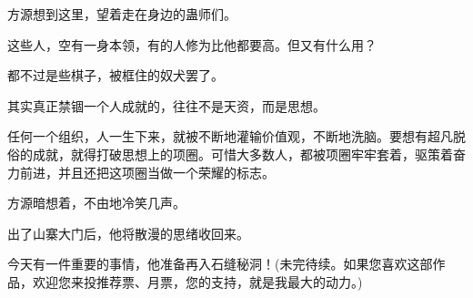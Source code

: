 \begin{this_body}
方源想到这里，望着走在身边的蛊师们。

这些人，空有一身本领，有的人修为比他都要高。但又有什么用？

都不过是些棋子，被框住的奴犬罢了。

其实真正禁锢一个人成就的，往往不是天资，而是思想。

任何一个组织，人一生下来，就被不断地灌输价值观，不断地洗脑。要想有超凡脱俗的成就，就得打破思想上的项圈。可惜大多数人，都被项圈牢牢套着，驱策着奋力前进，并且还把这项圈当做一个荣耀的标志。

方源暗想着，不由地冷笑几声。

出了山寨大门后，他将散漫的思绪收回来。

今天有一件重要的事情，他准备再入石缝秘洞！(未完待续。如果您喜欢这部作品，欢迎您来投推荐票、月票，您的支持，就是我最大的动力。)

\end{this_body}

